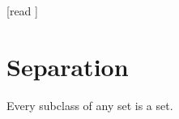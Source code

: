 \documentclass[10pt]{article}
\begin{document}
  \begin{imports}
    \begin{forthel}
      [read ]
    \end{forthel}
  \end{imports}


  \section{Separation}

  \begin{forthel}
    \begin{axiom}[title=Separation Axiom,id=FOUNDATIONS_10_2263707272871936,printid]
      Every subclass of any set is a set.
    \end{axiom}
  \end{forthel}
\end{document}
